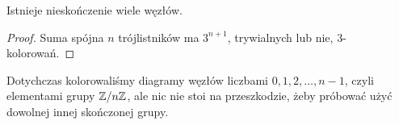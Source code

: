 \begin{corollary}
    Istnieje nieskończenie wiele węzłów.
\end{corollary}

\begin{proof}
    Suma spójna $n$ trójlistników ma $3^{n+1}$, trywialnych lub nie, $3$-kolorowań.
\end{proof}

Dotychczas kolorowaliśmy diagramy węzłów liczbami $0, 1, 2, \ldots, n-1$, czyli elementami grupy $\mathbb Z/n\mathbb Z$, ale nic nie stoi na przeszkodzie, żeby próbować użyć dowolnej innej skończonej grupy.





